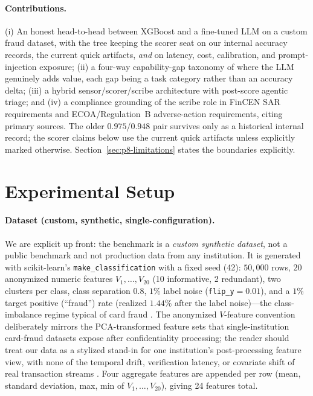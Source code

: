 \documentclass{article}
\providecommand{\secref}[1]{Section~\ref{#1}}
\begin{document}
\paragraph{Contributions.}
(i) An honest head-to-head between XGBoost and a fine-tuned LLM on a custom
fraud dataset, with the tree keeping the scorer seat on our internal accuracy
records, the current quick artifacts, \emph{and} on
latency, cost, calibration, and prompt-injection exposure;
(ii) a four-way capability-gap taxonomy of where the LLM genuinely adds value,
each gap being a task category rather than an accuracy delta;
(iii) a hybrid sensor/scorer/scribe architecture with post-score agentic
triage; and
(iv) a compliance grounding of the scribe role in FinCEN SAR requirements and
ECOA/Regulation~B adverse-action requirements, citing primary sources.
The older $0.975$/$0.948$ pair survives only as a historical internal record;
the scorer claims below use the current quick artifacts unless explicitly
marked otherwise. \secref{sec:p8-limitations} states the boundaries
explicitly.
 \section{Experimental Setup}
\label{sec:p8-setup}

\paragraph{Dataset (custom, synthetic, single-configuration).}
We are explicit up front: the benchmark is a \emph{custom synthetic dataset},
not a public benchmark and not production data from any institution. It is
generated with scikit-learn's \texttt{make\_classification}
\citep{pedregosa2011sklearn} with a fixed seed (42): $50{,}000$ rows, $20$
anonymized numeric features $V_1,\dots,V_{20}$ (10 informative, 2 redundant),
two clusters per class, class separation $0.8$, $1\%$ label noise
(\texttt{flip\_y}$=0.01$), and a $1\%$ target positive (``fraud'') rate
(realized $1.44\%$ after the label noise)---the
class-imbalance regime typical of card fraud \citep{dalpozzolo2018realistic}.
The anonymized $V$-feature convention deliberately mirrors the PCA-transformed
feature sets that single-institution card-fraud datasets expose after
confidentiality processing; the reader should treat our data as a stylized
stand-in for one institution's post-processing feature view, with none of the
temporal drift, verification latency, or covariate shift of real transaction
streams \citep{dalpozzolo2018realistic}. Four aggregate features are appended
per row (mean, standard deviation, max, min of $V_1,\dots,V_{20}$), giving 24
features total.
\end{document}

